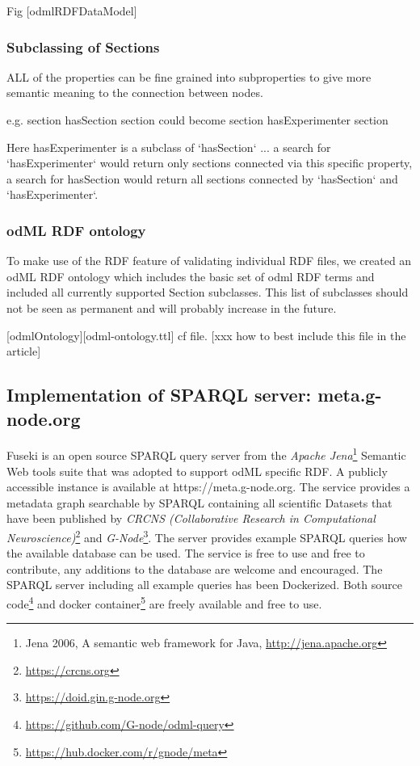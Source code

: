 \documentclass{article}
\begin{document}
Fig [odmlRDFDataModel]

\subsubsection{Subclassing of Sections}

ALL of the properties can be fine grained into subproperties to give more semantic meaning to the connection between nodes.

e.g.
    section hasSection section
 could become
    section hasExperimenter section

Here hasExperimenter is a subclass of `hasSection` ... a search for `hasExperimenter` would return only sections connected via this specific property, a search for hasSection would return all sections connected by `hasSection` and `hasExperimenter`.

\subsubsection{odML RDF ontology}
To make use of the RDF feature of validating individual RDF files, we created an odML RDF ontology which includes the basic set of odml RDF terms and included all currently supported Section subclasses. This list of subclasses should not be seen as permanent and
will probably increase in the future.

[odmlOntology][odml-ontology.ttl] cf file. [xxx how to best include this file in the article]

\subsection{Implementation of SPARQL server: meta.g-node.org}

Fuseki is an open source SPARQL query server from the \textit{Apache Jena}\footnote{Jena 2006, A semantic web framework for Java, \url{http://jena.apache.org}} Semantic Web tools suite that was adopted to support odML specific RDF. A publicly accessible instance is available at https://meta.g-node.org. The service provides a metadata graph searchable by SPARQL containing all scientific Datasets that have been published by \textit{CRCNS (Collaborative Research in Computational
Neuroscience)}\footnote{\url{https://crcns.org}} and \textit{G-Node}\footnote{\url{https://doid.gin.g-node.org}}. The server provides example SPARQL queries how the available database can be used. The service is free to use and free to contribute, any additions to the database are welcome and encouraged.
The SPARQL server including all example queries has been Dockerized. Both source code\footnote{\url{https://github.com/G-node/odml-query}} and docker container\footnote{\url{https://hub.docker.com/r/gnode/meta}} are freely available and free to use.
\end{document}
